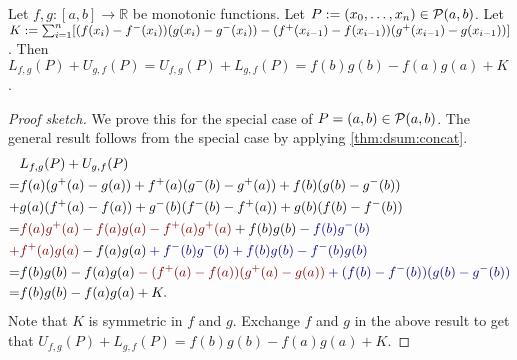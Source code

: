 \documentclass[a4paper,12pt,fleqn]{article}
\begin{document}
\begin{lemma}
\label{thm:dsum:by-parts}
Let $f, g: [a, b] \to \mathbb{R}$ be monotonic functions.
Let $P := (x_0, \ldots, x_n) \in \mathcal{P}(a, b)$.
Let $K := \sum_{i=1}^n [(f(x_i)-f^-(x_i))(g(x_i)-g^-(x_i))
- (f^+(x_{i-1})-f(x_{i-1}))(g^+(x_{i-1})-g(x_{i-1}))]$.
Then $L_{f,g}(P) + U_{g,f}(P) = U_{f,g}(P) + L_{g,f}(P) = f(b)g(b)-f(a)g(a) + K$.
\end{lemma}
\begin{proof}[Proof sketch]
We prove this for the special case of $P = (a, b) \in \mathcal{P}(a, b)$.
The general result follows from the special case by applying \cref{thm:dsum:concat}.
%
\begin{align*}
& L_{f,g}(P) + U_{g,f}(P)
\\ = &f(a)(g^+(a)-g(a)) + f^+(a)(g^-(b)-g^+(a)) + f(b)(g(b)-g^-(b))
    \\ + &g(a)(f^+(a)-f(a)) + g^-(b)(f^-(b)-f^+(a)) + g(b)(f(b)-f^-(b))
\\ = &\textcolor{textRed}{f(a)g^+(a) - f(a)g(a) - f^+(a)g^+(a)} + f(b)g(b) \mathbin{\textcolor{textBlue}{-}} \textcolor{textBlue}{f(b)g^-(b)}
    \\ \textcolor{textRed}{+} & \textcolor{textRed}{f^+(a)g(a)} - f(a)g(a) \mathbin{\textcolor{textBlue}{+}} \textcolor{textBlue}{f^-(b)g^-(b) + f(b)g(b) - f^-(b)g(b)}
\\ = &f(b)g(b) - f(a)g(a)
    \mathbin{\textcolor{textRed}{-}} \textcolor{textRed}{(f^+(a)-f(a))(g^+(a)-g(a))}
    \mathbin{\textcolor{textBlue}{+}} \textcolor{textBlue}{(f(b)-f^-(b))(g(b)-g^-(b))}
\\ = &f(b)g(b) - f(a)g(a) + K.
\end{align*}
Note that $K$ is symmetric in $f$ and $g$.
Exchange $f$ and $g$ in the above result to get that
$U_{f,g}(P) + L_{g,f}(P) = f(b)g(b) - f(a)g(a) + K$.
\end{proof}
\end{document}
